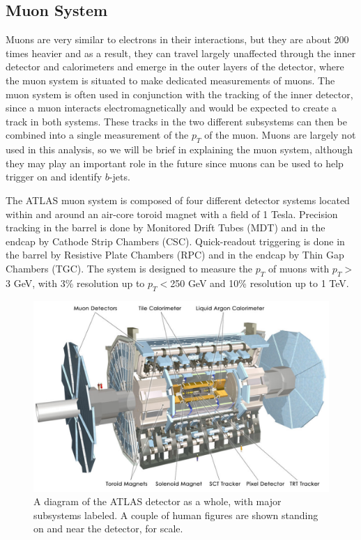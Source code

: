 \subsection{Muon System}
\label{sec:ms}
Muons are very similar to electrons in their interactions, but they are about 200 times heavier and as a 
result, they can travel largely unaffected through the inner detector and calorimeters and emerge in the outer layers of 
the detector, where the muon system is situated to make dedicated measurements of muons.  The muon system is 
often used in conjunction with the tracking of the inner detector, since a muon interacts electromagnetically and would be 
expected to create a track in both systems.  These tracks in the two different subsystems can then be combined 
into a single measurement of the $p_T$ of the muon.  Muons are largely not used 
in this analysis, so we will be brief in explaining the muon system, although they may play an 
important role in the future since muons can be used to help trigger on and identify $b$-jets.


The ATLAS muon system is composed of four different detector systems located within and around an air-core toroid 
magnet with a field of 1 Tesla.  Precision tracking in the barrel is done by Monitored Drift Tubes (MDT) 
and in the endcap by Cathode Strip Chambers (CSC).  Quick-readout triggering is done in 
the barrel by Resistive Plate Chambers (RPC) and in the endcap by Thin Gap Chambers (TGC).   
The system is designed to measure the $p_T$ of muons with $p_T>$
3 GeV, with 3\% resolution up to $p_T<$250 GeV and 10\% resolution up to 1 TeV.  



\begin{figure}
	\includegraphics[width=\textwidth]{ATLASDetector/images/AtlasDetectorLabeled.pdf}	\caption{A diagram of the ATLAS detector as a whole, with major subsystems labeled.  A couple of human figures are shown standing on and near the detector, for scale. \label{fig:detector}}
\end{figure}

